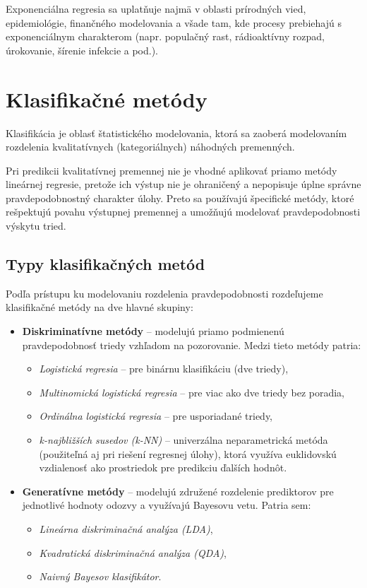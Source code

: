 Exponenciálna regresia sa uplatňuje najmä v oblasti prírodných vied, epidemiológie, finančného modelovania a všade tam, kde procesy prebiehajú s exponenciálnym charakterom (napr. populačný rast, rádioaktívny rozpad, úrokovanie, šírenie infekcie a pod.).

\section{Klasifikačné metódy}\label{sec:classification}

Klasifikácia je oblasť štatistického modelovania, ktorá sa zaoberá modelovaním rozdelenia kvalitatívnych (kategoriálnych) náhodných premenných. 

Pri predikcii kvalitatívnej premennej nie je vhodné aplikovať priamo metódy lineárnej regresie, pretože ich výstup nie je ohraničený a nepopisuje úplne správne pravdepodobnostný charakter úlohy. Preto sa používajú špecifické metódy, ktoré rešpektujú povahu výstupnej premennej a umožňujú modelovať pravdepodobnosti výskytu tried.

\subsection*{Typy klasifikačných metód}

Podľa prístupu ku modelovaniu rozdelenia pravdepodobnosti rozdeľujeme klasifikačné metódy na dve hlavné skupiny:

\begin{itemize}
  \item \textbf{Diskriminatívne metódy} – modelujú priamo podmienenú pravdepodobnosť triedy vzhľadom na pozorovanie. Medzi tieto metódy patria:
  \begin{itemize}
    \item \textit{Logistická regresia} – pre binárnu klasifikáciu (dve triedy),
    \item \textit{Multinomická logistická regresia} – pre viac ako dve triedy bez poradia,
    \item \textit{Ordinálna logistická regresia} – pre usporiadané triedy,
    \item \textit{k-najbližších susedov (k-NN)} – univerzálna neparametrická metóda (použiteľná aj pri riešení regresnej úlohy), ktorá využíva euklidovskú vzdialenosť ako prostriedok pre predikciu ďalších hodnôt.
  \end{itemize}
  
  \item \textbf{Generatívne metódy} – modelujú združené rozdelenie prediktorov pre jednotlivé hodnoty odozvy a využívajú Bayesovu vetu. Patria sem:
  \begin{itemize}
    \item \textit{Lineárna diskriminačná analýza (LDA)},
    \item \textit{Kvadratická diskriminačná analýza (QDA)},
    \item \textit{Naivný Bayesov klasifikátor}.
  \end{itemize}
\end{itemize}

